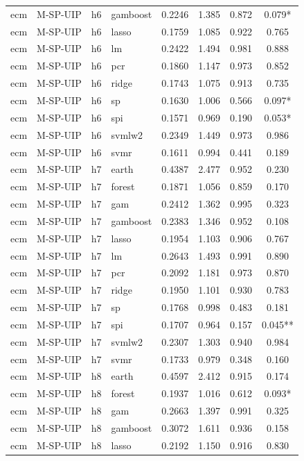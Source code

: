 \begin{ThreePartTable}
\begin{longtable}[t]{llclcccc}
ecm & M-SP-UIP & h6 & gamboost & 0.2246 & 1.385 & 0.872 & 0.079*\\
ecm & M-SP-UIP & h6 & lasso & 0.1759 & 1.085 & 0.922 & 0.765\\
ecm & M-SP-UIP & h6 & lm & 0.2422 & 1.494 & 0.981 & 0.888\\
ecm & M-SP-UIP & h6 & pcr & 0.1860 & 1.147 & 0.973 & 0.852\\
ecm & M-SP-UIP & h6 & ridge & 0.1743 & 1.075 & 0.913 & 0.735\\
ecm & M-SP-UIP & h6 & sp & 0.1630 & 1.006 & 0.566 & 0.097*\\
ecm & M-SP-UIP & h6 & spi & 0.1571 & 0.969 & 0.190 & 0.053*\\
ecm & M-SP-UIP & h6 & svmlw2 & 0.2349 & 1.449 & 0.973 & 0.986\\
ecm & M-SP-UIP & h6 & svmr & 0.1611 & 0.994 & 0.441 & 0.189\\
\addlinespace
ecm & M-SP-UIP & h7 & earth & 0.4387 & 2.477 & 0.952 & 0.230\\
ecm & M-SP-UIP & h7 & forest & 0.1871 & 1.056 & 0.859 & 0.170\\
ecm & M-SP-UIP & h7 & gam & 0.2412 & 1.362 & 0.995 & 0.323\\
ecm & M-SP-UIP & h7 & gamboost & 0.2383 & 1.346 & 0.952 & 0.108\\
ecm & M-SP-UIP & h7 & lasso & 0.1954 & 1.103 & 0.906 & 0.767\\
ecm & M-SP-UIP & h7 & lm & 0.2643 & 1.493 & 0.991 & 0.890\\
ecm & M-SP-UIP & h7 & pcr & 0.2092 & 1.181 & 0.973 & 0.870\\
ecm & M-SP-UIP & h7 & ridge & 0.1950 & 1.101 & 0.930 & 0.783\\
ecm & M-SP-UIP & h7 & sp & 0.1768 & 0.998 & 0.483 & 0.181\\
ecm & M-SP-UIP & h7 & spi & 0.1707 & 0.964 & 0.157 & 0.045**\\
ecm & M-SP-UIP & h7 & svmlw2 & 0.2307 & 1.303 & 0.940 & 0.984\\
ecm & M-SP-UIP & h7 & svmr & 0.1733 & 0.979 & 0.348 & 0.160\\
\addlinespace
ecm & M-SP-UIP & h8 & earth & 0.4597 & 2.412 & 0.915 & 0.174\\
ecm & M-SP-UIP & h8 & forest & 0.1937 & 1.016 & 0.612 & 0.093*\\
ecm & M-SP-UIP & h8 & gam & 0.2663 & 1.397 & 0.991 & 0.325\\
ecm & M-SP-UIP & h8 & gamboost & 0.3072 & 1.611 & 0.936 & 0.158\\
ecm & M-SP-UIP & h8 & lasso & 0.2192 & 1.150 & 0.916 & 0.830\\

\end{longtable}
\end{ThreePartTable}
